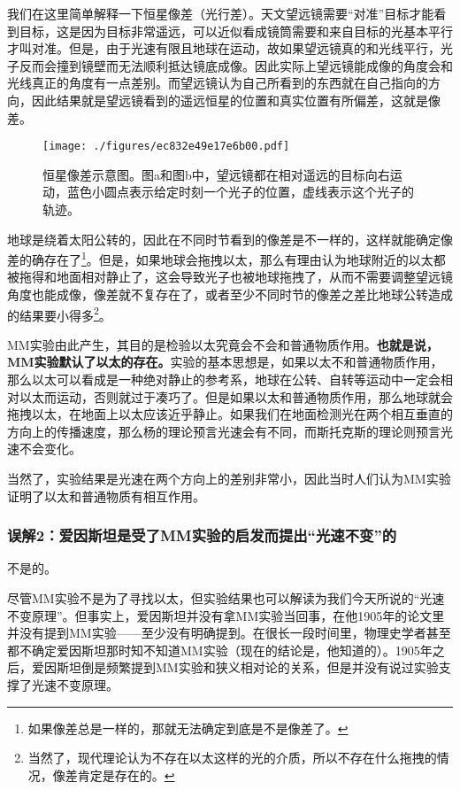 我们在这里简单解释一下恒星像差（光行差）。天文望远镜需要“对准”目标才能看到目标，这是因为目标非常遥远，可以近似看成镜筒需要和来自目标的光基本平行才叫对准。但是，由于光速有限且地球在运动，故如果望远镜真的和光线平行，光子反而会撞到镜壁而无法顺利抵达镜底成像。因此实际上望远镜能成像的角度会和光线真正的角度有一点差别。而望远镜认为自己所看到的东西就在自己指向的方向，因此结果就是望远镜看到的遥远恒星的位置和真实位置有所偏差，这就是像差。

\begin{figure}[ht]
\centering
\texttt{[image: ./figures/ec832e49e17e6b00.pdf]}
\caption{恒星像差示意图。图a和图b中，望远镜都在相对遥远的目标向右运动，蓝色小圆点表示给定时刻一个光子的位置，虚线表示这个光子的轨迹。} \label{fig_SpeRel_1}
\end{figure}

地球是绕着太阳公转的，因此在不同时节看到的像差是不一样的，这样就能确定像差的确存在了\footnote{如果像差总是一样的，那就无法确定到底是不是像差了。}。但是，如果地球会拖拽以太，那么有理由认为地球附近的以太都被拖得和地面相对静止了，这会导致光子也被地球拖拽了，从而不需要调整望远镜角度也能成像，像差就不复存在了，或者至少不同时节的像差之差比地球公转造成的结果要小得多\footnote{当然了，现代理论认为不存在以太这样的光的介质，所以不存在什么拖拽的情况，像差肯定是存在的。}。



MM实验由此产生，其目的是检验以太究竟会不会和普通物质作用。\textbf{也就是说，MM实验默认了以太的存在。}实验的基本思想是，如果以太不和普通物质作用，那么以太可以看成是一种绝对静止的参考系，地球在公转、自转等运动中一定会相对以太而运动，否则就过于凑巧了。但是如果以太和普通物质作用，那么地球就会拖拽以太，在地面上以太应该近乎静止。如果我们在地面检测光在两个相互垂直的方向上的传播速度，那么杨的理论预言光速会有不同，而斯托克斯的理论则预言光速不会变化。

当然了，实验结果是光速在两个方向上的差别非常小，因此当时人们认为MM实验证明了以太和普通物质有相互作用。

\subsubsection{误解2：爱因斯坦是受了MM实验的启发而提出“光速不变”的}

不是的。

尽管MM实验不是为了寻找以太，但实验结果也可以解读为我们今天所说的“光速不变原理”。但事实上，爱因斯坦并没有拿MM实验当回事，在他1905年的论文里并没有提到MM实验——至少没有明确提到。在很长一段时间里，物理史学者甚至都不确定爱因斯坦那时知不知道MM实验（现在的结论是，他知道的）。1905年之后，爱因斯坦倒是频繁提到MM实验和狭义相对论的关系，但是并没有说过实验支撑了光速不变原理。

